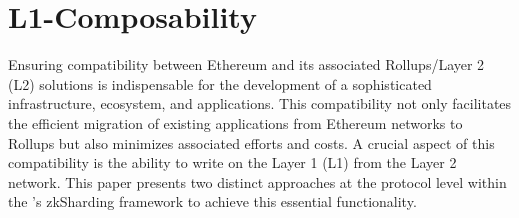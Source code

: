 \chapter{L1-Composability}
\label{section:l1composability}

Ensuring compatibility between Ethereum and its associated Rollups/Layer 2 (L2) 
solutions is indispensable for the development of a sophisticated infrastructure, 
ecosystem, and applications. This compatibility not only facilitates the efficient 
migration of existing applications from Ethereum networks to Rollups but also 
minimizes associated efforts and costs. A crucial aspect of this compatibility is 
the ability to write on the Layer 1 (L1) from the Layer 2 network. This paper 
presents two distinct approaches at the protocol level within the \nil's 
zkSharding framework to achieve this essential functionality.
